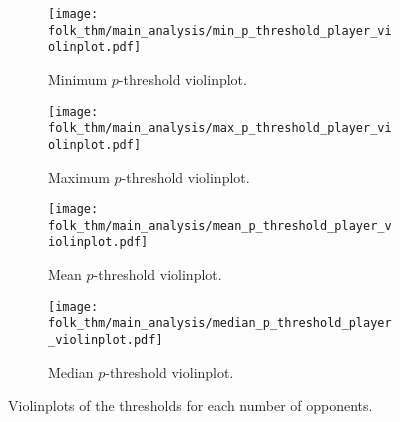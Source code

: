 \begin{figure}
    \begin{subfigure}{0.45\textwidth}
        \centering
        \texttt{[image: folk\_thm/main\_analysis/min\_p\_threshold\_player\_violinplot.pdf]}
        \caption{Minimum \(p\)-threshold violinplot.}\label{subfig:min_thresh_player_violinplot}
    \end{subfigure}
    \begin{subfigure}{0.45\textwidth}
        \centering
        \texttt{[image: folk\_thm/main\_analysis/max\_p\_threshold\_player\_violinplot.pdf]}
        \caption{Maximum \(p\)-threshold violinplot.}\label{subfig:max_thresh_player_violinplot}
    \end{subfigure}

    \begin{subfigure}{0.45\textwidth}
        \centering
        \texttt{[image: folk\_thm/main\_analysis/mean\_p\_threshold\_player\_violinplot.pdf]}
        \caption{Mean \(p\)-threshold violinplot.}\label{subfig:mean_thresh_player_violinplot}        
    \end{subfigure}
    \begin{subfigure}{0.45\textwidth}
        \centering
        \texttt{[image: folk\_thm/main\_analysis/median\_p\_threshold\_player\_violinplot.pdf]}
        \caption{Median \(p\)-threshold violinplot.}\label{subfig:median_thresh_player_violinplot}
    \end{subfigure}
    \caption{Violinplots of the thresholds for each number of opponents.}\label{fig:player_mean_thresh_violinplot}
\end{figure}

